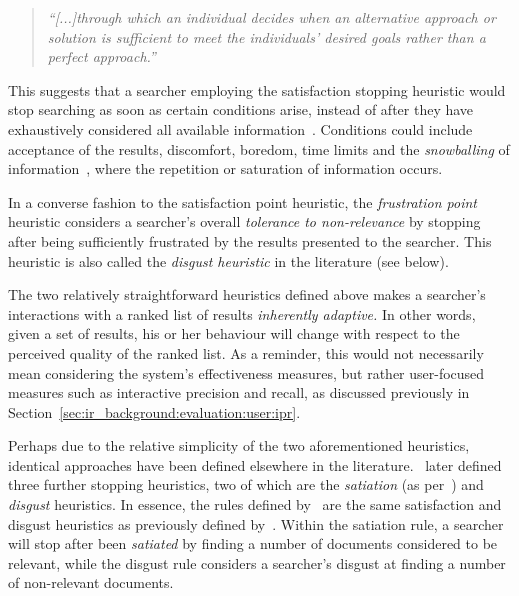 \begin{quote}
    \emph{``[...]through which an individual decides when an alternative approach or solution is sufficient to meet the individuals' desired goals rather than a perfect approach.''}
\end{quote}

This suggests that a searcher employing the satisfaction stopping heuristic would stop searching as soon as certain conditions arise, instead of after they have exhaustively considered all available information~\citep{march1994primer}. Conditions could include acceptance of the results, discomfort, boredom, time limits and the \emph{snowballing} of information~\citep{mansourian2007search}, where the repetition or saturation of information occurs.

In a converse fashion to the satisfaction point heuristic, the \emph{frustration point} heuristic considers a searcher's overall \emph{tolerance to non-relevance} by stopping after being sufficiently frustrated by the results presented to the searcher. This heuristic is also called the \emph{disgust heuristic} in the literature (see below).

The two relatively straightforward heuristics defined above makes a searcher's interactions with a ranked list of results \emph{inherently adaptive.} In other words, given a set of results, his or her behaviour will change with respect to the perceived quality of the ranked list. As a reminder, this would not necessarily mean considering the system's effectiveness measures, but rather user-focused measures such as interactive precision and recall, as discussed previously in Section~\ref{sec:ir_background:evaluation:user:ipr}.

Perhaps due to the relative simplicity of the two aforementioned heuristics, identical approaches have been defined elsewhere in the literature.~\cite{kraft1979stopping_rules} later defined three further stopping heuristics, two of which are the \emph{satiation} (as per~\cite{simon1955satiation}) and \emph{disgust} heuristics. In essence, the rules defined by~\cite{kraft1979stopping_rules} are the same satisfaction and disgust heuristics as previously defined by~\cite{cooper1973retrieval_effectiveness_ii}. Within the satiation rule, a searcher will stop after been \emph{satiated} by finding a number of documents considered to be relevant, while the disgust rule considers a searcher's disgust at finding a number of non-relevant documents.

